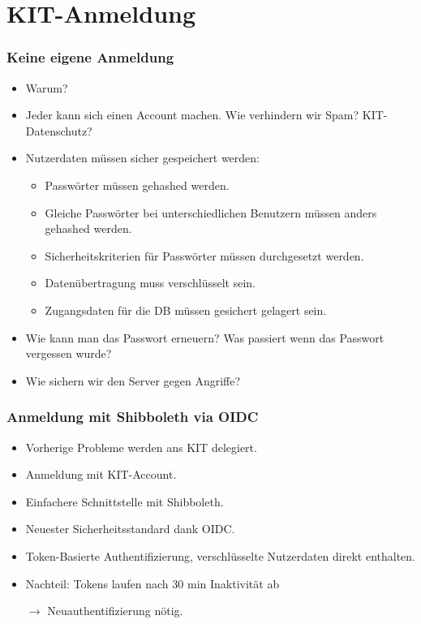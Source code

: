 \section{KIT-Anmeldung}

\begin{frame}\frametitle{Keine eigene Anmeldung}
    \begin{itemize}
        \item Warum? \pause
        \item Jeder kann sich einen Account machen. Wie verhindern wir Spam? KIT-Datenschutz?
        \item Nutzerdaten müssen sicher gespeichert werden: \begin{itemize}
            \item Passwörter müssen gehashed werden.
            \item Gleiche Passwörter bei unterschiedlichen Benutzern müssen anders gehashed werden.
            \item Sicherheitskriterien für Passwörter müssen durchgesetzt werden.
            \item Datenübertragung muss verschlüsselt sein.
            \item Zugangsdaten für die DB müssen gesichert gelagert sein.
        \end{itemize}
        \item Wie kann man das Passwort erneuern? Was passiert wenn das Passwort vergessen wurde?
        \item Wie sichern wir den Server gegen Angriffe?
    \end{itemize}
\end{frame}

\begin{frame}\frametitle{Anmeldung mit Shibboleth via OIDC}
    \begin{itemize}
        \item Vorherige Probleme werden ans KIT delegiert.
        \item Anmeldung mit KIT-Account.
        \item Einfachere Schnittstelle mit Shibboleth.
        \item Neuester Sicherheitsstandard dank OIDC.
        \item Token-Basierte Authentifizierung, verschlüsselte Nutzerdaten direkt enthalten.
        \pause
        \item Nachteil: Tokens laufen nach 30 min Inaktivität ab
        \item[$\rightarrow$] Neuauthentifizierung nötig.
    \end{itemize}
\end{frame}

